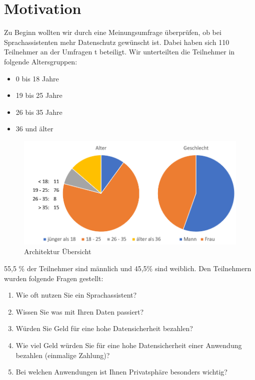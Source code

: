 \section{Motivation} \label{umfrage}

Zu Beginn wollten wir durch eine Meinungsumfrage überprüfen, ob bei Sprachassistenten mehr Datenschutz gewünscht ist. Dabei haben sich 110 Teilnehmer an der Umfragen t beteiligt. Wir unterteilten die Teilnehmer in folgende Altersgruppen:

\begin{itemize}
	\item 0 bis 18 Jahre 
	\item 19 bis 25 Jahre
	\item 26 bis 35 Jahre
	\item 36 und älter	
\end{itemize}

\begin{figure}[h!]
	\centering
	\includegraphics[width=0.7\linewidth]{Picture/umfrage_teilnehmer}
	\caption[Architektur Übersicht]{Architektur Übersicht}
	\label{fig:umfrage_teilnehmer}
\end{figure}

55,5 \% der Teilnehmer sind männlich und 45,5\% sind weiblich. Den Teilnehmern wurden folgende Fragen gestellt:

\begin{enumerate}
	
	\item Wie oft nutzen Sie ein Sprachassistent?
	\item Wissen Sie was mit Ihren Daten passiert?
	\item Würden Sie Geld für eine hohe Datensicherheit bezahlen?
	\item Wie viel Geld würden Sie für eine hohe Datensicherheit einer Anwendung bezahlen (einmalige Zahlung)?
	\item Bei welchen Anwendungen ist Ihnen Privatsphäre besonders wichtig?
	
\end{enumerate}

